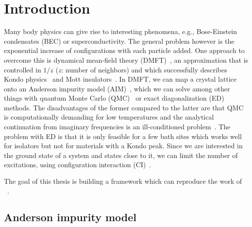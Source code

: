 \chapter{Introduction}

Many body physics can give rise to interesting phenomena,
e.g., Bose-Einstein condensates (BEC) or superconductivity.
The general problem however
is the exponential increase of configurations with each particle added.
One approach to overcome this
is dynamical mean-field theory (DMFT)~\cite{Georges1996},
an approximation that is controlled in $1/z$ ($z$: number of neighbors)
and which successfully describes
Kondo physics~\cite{Wilson1975, Andrei1983}
and Mott insulators~\cite{MOTT1968}.
In DMFT, we can map a crystal lattice onto an
Anderson impurity model (AIM)~\cite{Anderson1961},
which we can solve among other things with
quantum Monte Carlo (QMC)~\cite{Hirsch1986, Gull2011}
or exact diagonalization (ED)~\cite{Caffarel1994} methods.
The disadvantages of the former compared to the latter are
that QMC is computationally demanding for low temperatures and the
analytical continuation from imaginary frequencies
is an ill-conditioned problem~\cite{Silver1990}.
The problem with ED is that it is only feasible for a few bath sites
which works well for isolators but not for materials with a Kondo peak.
Since we are interested in the ground state of a system and states close
to it,
we can limit the number of excitations,
using configuration interaction (CI)~\cite{Nesbet1967, Nesbet1970}.

The goal of this thesis is building a framework which can reproduce the work
of \citeauthor*{Lu2019}~\cite{Lu2019}.

\section{Anderson impurity model}
\label{sec:AIM}

